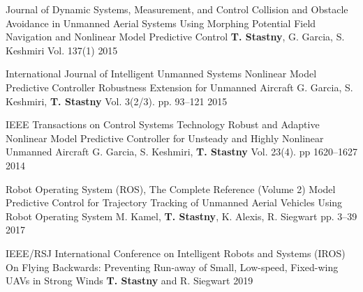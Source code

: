 \begin{cventries}
\cvpubentry
	{Journal of Dynamic Systems, Measurement, and Control} %
	{Collision and Obstacle Avoidance in Unmanned Aerial Systems Using Morphing Potential Field Navigation and Nonlinear Model Predictive Control} %
	{\textbf{T. Stastny}, G. Garcia, S. Keshmiri} %
	{Vol. 137(1)} %
	{2015} %
	{} %
	{} %
	
\cvpubentry
	{International Journal of Intelligent Unmanned Systems} %
	{Nonlinear Model Predictive Controller Robustness Extension for Unmanned Aircraft} %
	{G. Garcia, S. Keshmiri, \textbf{T. Stastny}} %
	{Vol. 3(2/3). pp. 93--121} %
	{2015} %
	{} %
	{} %

\cvpubentry
	{IEEE Transactions on Control Systems Technology} %
	{Robust and Adaptive Nonlinear Model Predictive Controller for Unsteady and Highly Nonlinear Unmanned Aircraft} %
	{G. Garcia, S. Keshmiri, \textbf{T. Stastny}} %
	{Vol. 23(4). pp 1620--1627} %
	{2014} %
	{} %
	{} %


\begin{flushleft}
\end{flushleft}

\cvpubentry
	{Robot Operating System (ROS), The Complete Reference (Volume 2)} %
	{Model Predictive Control for Trajectory Tracking of Unmanned Aerial Vehicles Using Robot Operating System} %
	{M. Kamel, \textbf{T. Stastny}, K. Alexis, R. Siegwart} %
	{pp. 3--39} %
	{2017} %
	{} %
	{} %


\begin{flushleft}
\end{flushleft}

\cvpubentry
	{IEEE/RSJ International Conference on Intelligent Robots and Systems (IROS)} %
	{On Flying Backwards: Preventing Run-away of Small, Low-speed, Fixed-wing UAVs in Strong Winds} %
	{\textbf{T. Stastny} and R. Siegwart} %
	{} %
	{2019} %
	{} %
	{} %


\end{cventries}
